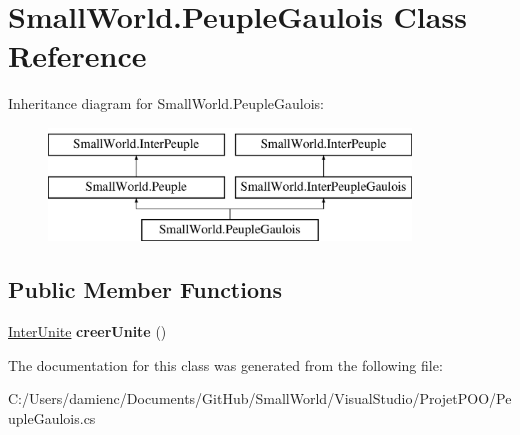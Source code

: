 \hypertarget{class_small_world_1_1_peuple_gaulois}{\section{Small\-World.\-Peuple\-Gaulois Class Reference}
\label{class_small_world_1_1_peuple_gaulois}
}
Inheritance diagram for Small\-World.\-Peuple\-Gaulois\-:\begin{figure}[H]
\begin{center}
\leavevmode
\includegraphics[height=3.000000cm]{class_small_world_1_1_peuple_gaulois}
\end{center}
\end{figure}
\subsection*{Public Member Functions}
\begin{DoxyCompactItemize}
\item 
\hypertarget{class_small_world_1_1_peuple_gaulois_a7c83ef827cd0a3202425487f8911776e}{\hyperlink{interface_small_world_1_1_inter_unite}{Inter\-Unite} {\bfseries creer\-Unite} ()}\label{class_small_world_1_1_peuple_gaulois_a7c83ef827cd0a3202425487f8911776e}

\end{DoxyCompactItemize}


The documentation for this class was generated from the following file\-:\begin{DoxyCompactItemize}
\item 
C\-:/\-Users/damienc/\-Documents/\-Git\-Hub/\-Small\-World/\-Visual\-Studio/\-Projet\-P\-O\-O/Peuple\-Gaulois.\-cs\end{DoxyCompactItemize}
